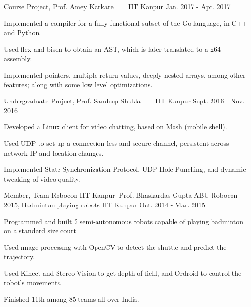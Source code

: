 \begin{cventries}
  \cventry
  {Course Project, Prof. Amey Karkare}
  {\href{https://github.com/pallavagarwal07/amigo.git}{}
    \ \ \ \normalfont\href{https://github.com/pallavagarwal07/amigo}
    {}}
  {IIT Kanpur}
  {Jan. 2017 - Apr. 2017}
  {
    \begin{cvitems}
    \item Implemented a compiler for a fully functional subset of the Go language, in C++ and Python.
    \item Used flex and bison to obtain an AST, which is later translated to a x64 assembly.
    \item Implemented pointers, multiple return values, deeply nested arrays, among other features; along with some low level optimizations.
    \end{cvitems}
  }

  \cventry
  {Undergraduate Project, Prof. Sandeep Shukla}
  {\href{https://github.com/netsecIITK/moVi}{}
    \ \ \ \normalfont\href{https://github.com/netsecIITK/moVi}
    {}}
  {IIT Kanpur}
  {Sept. 2016 - Nov. 2016}
  {
    \begin{cvitems}
    \item Developed a Linux client for video chatting,
      based on \href{https://mosh.org/}{Mosh (mobile shell)}.
    \item Used UDP to set up a connection-less and secure channel,
      persistent across network IP and location changes.
    \item Implemented State Synchronization Protocol, UDP Hole
      Punching, and dynamic tweaking of video quality.
    \end{cvitems}
  }

  \cventry
  {Member, Team Robocon IIT Kanpur, Prof. Bhaskardas Gupta}
  {ABU Robocon 2015, Badminton playing robots}
  {IIT Kanpur}
  {Oct. 2014 - Mar. 2015}
  {
    \begin{cvitems}
    \item Programmed and built 2 semi-autonomous robots
      capable of playing badminton on a standard size court.
    \item Used image processing with OpenCV to detect the shuttle
      and predict the trajectory.
    \item Used Kinect and Stereo Vision to get depth of
      field, and Ordroid to control the robot's movements.
    \item Finished 11th among 85 teams all over India.
    \end{cvitems}
  }

\end{cventries}

